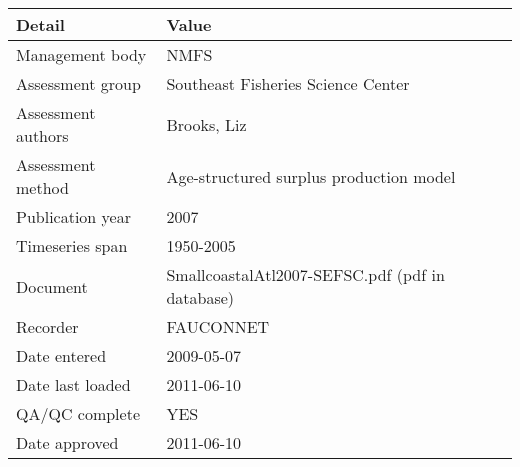 \begin{table}[htb]
\centering
\begin{tabular}{lp{7cm}}
\toprule
Detail & Value \\
\midrule
Management body    & NMFS                                            \\
Assessment group   & Southeast Fisheries Science Center              \\
Assessment authors & Brooks, Liz                                     \\
Assessment method  & Age-structured surplus production model         \\
Publication year   & 2007                                            \\
Timeseries span    & 1950-2005                                       \\
Document           & SmallcoastalAtl2007-SEFSC.pdf (pdf in database) \\
Recorder           & FAUCONNET                                       \\
Date entered       & 2009-05-07                                      \\
Date last loaded   & 2011-06-10                                      \\
QA/QC complete     & YES                                             \\
Date approved      & 2011-06-10                                      \\
\bottomrule
\end{tabular}
\label{tab:assessdet}
\end{table}
